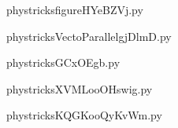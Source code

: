     

    \clearpage
    


    \newcommand{\CaptionFigfigureHYeBZVj}{<+Type your caption here+>}
    \begin{center}
        
    \end{center}
    phystricksfigureHYeBZVj.py

    

    \clearpage
    


    \newcommand{\CaptionFigVectoParallelgjDlmD}{<+Type your caption here+>}
    \begin{center}
        
    \end{center}
    phystricksVectoParallelgjDlmD.py

    

    \clearpage
    


    \newcommand{\CaptionFigGCxOEgb}{<+Type your caption here+>}
    \begin{center}
        
    \end{center}
    phystricksGCxOEgb.py

    

    \clearpage
    


    \newcommand{\CaptionFigXVMLooOHswig}{<+Type your caption here+>}
    \begin{center}
        
    \end{center}
    phystricksXVMLooOHswig.py

    

    \clearpage
    


    \newcommand{\CaptionFigKQGKooQyKvWm}{<+Type your caption here+>}
    \begin{center}
        
    \end{center}
    phystricksKQGKooQyKvWm.py

    

    \clearpage
    


